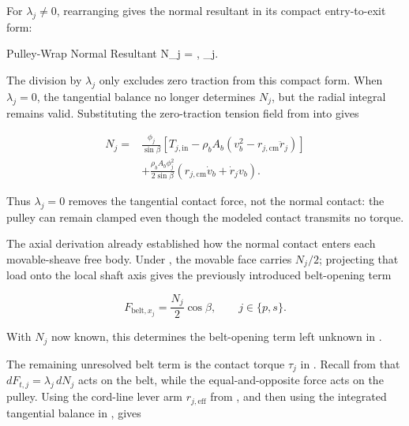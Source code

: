 \documentclass[11pt]{report}
\numberwithin{equation}{section}
\newcounter{assump}
\begin{document}
For \(\lambda_j\neq0\), rearranging gives the normal resultant in its compact
entry-to-exit form:

{Pulley-Wrap Normal Resultant}
{
    N_j
    =
    ,
    \qquad
    \lambda_j.
}

The division by \(\lambda_j\) only excludes zero traction from this compact
form. When \(\lambda_j=0\), the tangential balance no longer determines
\(N_j\), but the radial integral remains valid. Substituting the zero-traction
tension field from  into
 gives

\begin{equation}
\begin{aligned}
    N_j
    ={}&
    \frac{\phi_j}{\sin\beta}
    \left[
        T_{j,\mathrm{in}}
        -
        \rho_bA_b
        \left(
            v_b^2-r_{j,\mathrm{cm}}\ddot r_j
        \right)
    \right]
    \\
    &+
    \frac{\rho_bA_b\phi_j^2}{2\sin\beta}
    \left(
        r_{j,\mathrm{cm}}\dot v_b+
        \dot r_jv_b
    \right).
\end{aligned}
    \label{eq:wrap_normal_resultant_zero_lambda}
\end{equation}

Thus \(\lambda_j=0\) removes the tangential contact force, not the normal
contact: the pulley can remain clamped even though the modeled contact
transmits no torque.

The axial derivation already established how the normal contact enters each
movable-sheave free body. Under
, the movable face carries \(N_j/2\);
projecting that load onto the local shaft axis gives the previously introduced
belt-opening term

\[
    F_{\mathrm{belt},x_j}
    =
    \frac{N_j}{2}\cos\beta,
    \qquad
    j\in\{p,s\}.
\]

With \(N_j\) now known, this determines the belt-opening term left unknown in
.

The remaining unresolved belt term is the contact torque \(\tau_j\) in
.
Recall from  that
\(dF_{t,j}=\lambda_j\,dN_j\) acts on the belt, while the equal-and-opposite
force acts on the pulley. Using the cord-line lever arm
\(r_{j,\mathrm{eff}}\) from , and then
using the integrated tangential balance in
, gives
\end{document}
